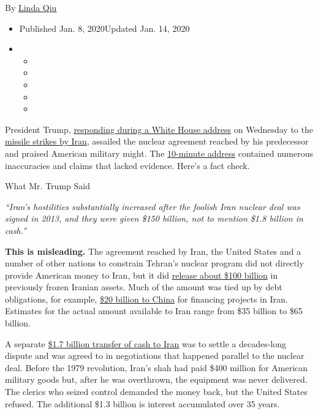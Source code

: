 By \href{https://www.nytimes3xbfgragh.onion/by/linda-qiu}{Linda Qiu}

\begin{itemize}
\item
  Published Jan. 8, 2020Updated Jan. 14, 2020
\item
  \begin{itemize}
  \item
  \item
  \item
  \item
  \item
  \end{itemize}
\end{itemize}

President Trump,
\href{https://www.nytimes3xbfgragh.onion/2020/01/08/world/middleeast/trump-speech.html}{responding
during a White House address} on Wednesday to the
\href{https://www.nytimes3xbfgragh.onion/2020/01/07/world/middleeast/iran-fires-missiles-us.html}{missile
strikes by Iran}, assailed the nuclear agreement reached by his
predecessor and praised American military might. The
\href{https://www.nytimes3xbfgragh.onion/2020/01/08/us/politics/trump-address.html}{10-minute
address} contained numerous inaccuracies and claims that lacked
evidence. Here's a fact check.

What Mr. Trump Said

\emph{``Iran's hostilities substantially increased after the foolish
Iran nuclear deal was signed in 2013, and they were given \$150 billion,
not to mention \$1.8 billion in cash.''}

\textbf{This is misleading.} The agreement reached by Iran, the United
States and a number of other nations to constrain Tehran's nuclear
program did not directly provide American money to Iran, but it did
\href{https://www.nytimes3xbfgragh.onion/2016/01/17/world/middleeast/iran-sanctions-lifted-nuclear-deal.html}{release
about \$100 billion} in previously frozen Iranian assets. Much of the
amount was tied up by debt obligations, for example,
\href{https://www.washingtonpost.com/world/national-security/hearing-on-iran-nuclear-deal-opens-with-sharp-gop-criticism/2015/07/23/2003439e-309d-11e5-8f36-18d1d501920d_story.html?utm_term=.a19fd79013dc}{\$20
billion to China} for financing projects in Iran. Estimates for the
actual amount available to Iran range from \$35 billion to \$65 billion.

A separate
\href{https://www.nytimes3xbfgragh.onion/2016/08/19/world/middleeast/iran-us-cash-payment-prisoners.html}{\$1.7
billion transfer of cash to Iran} was to settle a decades-long dispute
and was agreed to in negotiations that happened parallel to the nuclear
deal. Before the 1979 revolution, Iran's shah had paid \$400 million for
American military goods but, after he was overthrown, the equipment was
never delivered. The clerics who seized control demanded the money back,
but the United States refused. The additional \$1.3 billion is interest
accumulated over 35 years.

